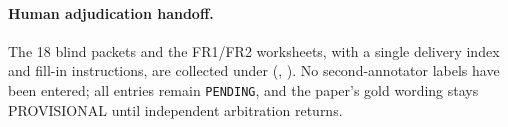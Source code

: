 \paragraph{Human adjudication handoff.}
The 18 blind packets and the FR1/FR2 worksheets, with a single delivery index
and fill-in instructions, are collected under 
(,
). No second-annotator labels have been
entered; all entries remain \texttt{PENDING}, and the paper's gold wording
stays PROVISIONAL until independent arbitration returns.
